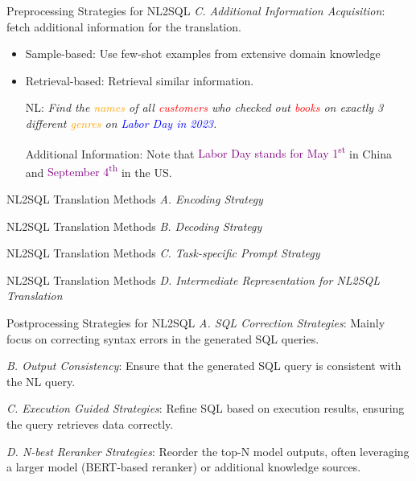 \documentclass[aspectratio=169,xcolor=dvipsnames]{beamer}
\begin{document}
\begin{frame}{Preprocessing Strategies for NL2SQL}
    \textit{C. Additional Information Acquisition}: fetch additional information for the translation.
    \begin{itemize}
        \item Sample-based: Use few-shot examples from extensive domain knowledge
        
        \item Retrieval-based: Retrieval similar information.
        \begin{example}
            NL: \textit{Find the \textcolor{orange}{names} of all \textcolor{red}{customers} who checked out \textcolor{red}{books} on exactly 3 different \textcolor{orange}{genres} on \textcolor{blue}{Labor Day in 2023}.}

            Additional Information: Note that \textcolor{purple}{Labor Day stands for May 1\textsuperscript{st}} in China and \textcolor{purple}{September 4\textsuperscript{th}} in the US.
        \end{example}
    \end{itemize}
\end{frame}

\begin{frame}{NL2SQL Translation Methods}
    \textit{A. Encoding Strategy}
\end{frame}

\begin{frame}{NL2SQL Translation Methods}
    \textit{B. Decoding Strategy}
\end{frame}

\begin{frame}{NL2SQL Translation Methods}
    \textit{C. Task-specific Prompt Strategy}
\end{frame}

\begin{frame}{NL2SQL Translation Methods}
    \textit{D. Intermediate Representation for NL2SQL Translation}
\end{frame}

\begin{frame}{Postprocessing Strategies for NL2SQL}
    \textit{A. SQL Correction Strategies}: Mainly focus on correcting syntax errors in the generated SQL queries.

    \textit{B. Output Consistency}: Ensure that the generated SQL query is consistent with the NL query.

    \textit{C. Execution Guided Strategies}: Refine SQL based on execution results, ensuring the query retrieves data correctly.

    \textit{D. N-best Reranker Strategies}: Reorder the top-N model outputs, often leveraging a larger model (BERT-based reranker) or additional knowledge sources.
\end{frame}
\end{document}
